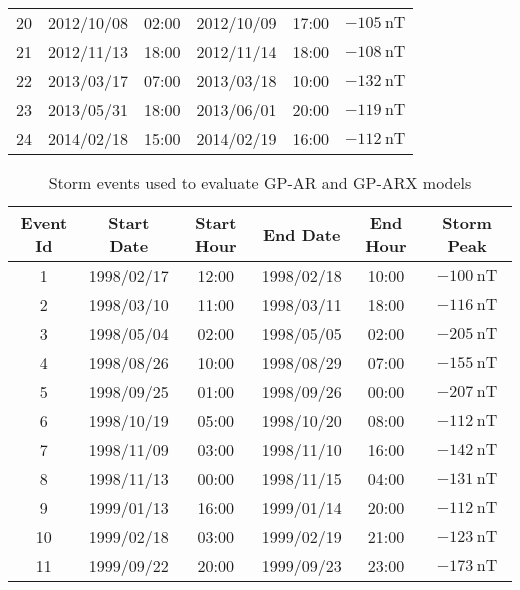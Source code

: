 \begin{table}[ht]
\begin{tabular}{llllll}
    20 & 2012/10/08 & 02:00 & 2012/10/09 & 17:00 & $ \SI{-105}{\nano\tesla}$ \\
    21 & 2012/11/13 & 18:00 & 2012/11/14 & 18:00 & $ \SI{-108}{\nano\tesla}$ \\
    22 & 2013/03/17 & 07:00 & 2013/03/18 & 10:00 & $ \SI{-132}{\nano\tesla}$ \\
    23 & 2013/05/31 & 18:00 & 2013/06/01 & 20:00 & $ \SI{-119}{\nano\tesla}$ \\
    24 & 2014/02/18 & 15:00 & 2014/02/19 & 16:00 & $ \SI{-112}{\nano\tesla}$ \\ \hline
    \end{tabular}
    \end{table}
    
    

    \begin{table}[ht]
    \centering
    \caption{Storm events used to evaluate GP-AR and GP-ARX models}
    \label{table:teststorms}
    \begin{adjustbox}{width=\textwidth,totalheight=0.9\textheight,keepaspectratio}
    \begin{tabular}{cccccc}
    \hline
    \textbf{Event Id} & \textbf{Start Date} & \textbf{Start Hour} & \textbf{End Date} & \textbf{End Hour} & \textbf{Storm Peak} \\ \hline
    1 & 1998/02/17 & 12:00 & 1998/02/18 & 10:00 & $ \SI{-100}{\nano\tesla}$ \\
    2 & 1998/03/10 & 11:00 & 1998/03/11 & 18:00 & $ \SI{-116}{\nano\tesla}$ \\
    3 & 1998/05/04 & 02:00 & 1998/05/05 & 02:00 & $ \SI{-205}{\nano\tesla}$ \\
    4 & 1998/08/26 & 10:00 & 1998/08/29 & 07:00 & $ \SI{-155}{\nano\tesla}$ \\
    5 & 1998/09/25 & 01:00 & 1998/09/26 & 00:00 & $ \SI{-207}{\nano\tesla}$ \\
    6 & 1998/10/19 & 05:00 & 1998/10/20 & 08:00 & $ \SI{-112}{\nano\tesla}$ \\
    7 & 1998/11/09 & 03:00 & 1998/11/10 & 16:00 & $ \SI{-142}{\nano\tesla}$ \\
    8 & 1998/11/13 & 00:00 & 1998/11/15 & 04:00 & $ \SI{-131}{\nano\tesla}$ \\
    9 & 1999/01/13 & 16:00 & 1999/01/14 & 20:00 & $ \SI{-112}{\nano\tesla}$ \\
    10 & 1999/02/18 & 03:00 & 1999/02/19 & 21:00 & $ \SI{-123}{\nano\tesla}$ \\
    11 & 1999/09/22 & 20:00 & 1999/09/23 & 23:00 & $ \SI{-173}{\nano\tesla}$ \\

\end{tabular}
\end{adjustbox}
\end{table}
